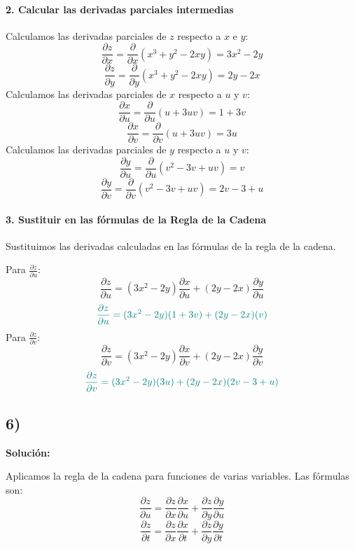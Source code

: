 \documentclass{article}
\begin{document}
\paragraph{2. Calcular las derivadas parciales intermedias}
Calculamos las derivadas parciales de $z$ respecto a $x$ e $y$:
\[
\frac{\partial z}{\partial x} = \frac{\partial}{\partial x}(x^3 + y^2 - 2xy) = 3x^2 - 2y
\]
\[
\frac{\partial z}{\partial y} = \frac{\partial}{\partial y}(x^3 + y^2 - 2xy) = 2y - 2x
\]
Calculamos las derivadas parciales de $x$ respecto a $u$ y $v$:
\[
\frac{\partial x}{\partial u} = \frac{\partial}{\partial u}(u + 3uv) = 1 + 3v
\]
\[
\frac{\partial x}{\partial v} = \frac{\partial}{\partial v}(u + 3uv) = 3u
\]
Calculamos las derivadas parciales de $y$ respecto a $u$ y $v$:
\[
\frac{\partial y}{\partial u} = \frac{\partial}{\partial u}(v^2 - 3v + uv) = v
\]
\[
\frac{\partial y}{\partial v} = \frac{\partial}{\partial v}(v^2 - 3v + uv) = 2v - 3 + u
\]

\paragraph{3. Sustituir en las fórmulas de la Regla de la Cadena}
Sustituimos las derivadas calculadas en las fórmulas de la regla de la cadena.

Para $\frac{\partial z}{\partial u}$:
\[
\frac{\partial z}{\partial u} = (3x^2 - 2y) \frac{\partial x}{\partial u} + (2y - 2x) \frac{\partial y}{\partial u}
\]
\[\color{teal}
\frac{\partial z}{\partial u} = (3x^2 - 2y) (1 + 3v) + (2y - 2x) (v)
\]
Para $\frac{\partial z}{\partial v}$:
\[
\frac{\partial z}{\partial v} = (3x^2 - 2y) \frac{\partial x}{\partial v} + (2y - 2x) \frac{\partial y}{\partial v}
\]
\[\color{teal}
\frac{\partial z}{\partial v} = (3x^2 - 2y) (3u) + (2y - 2x) (2v - 3 + u)
\]

\subsection*{6)}


\textbf{Solución:}

Aplicamos la regla de la cadena para funciones de varias variables. Las fórmulas son:
\[
\frac{\partial z}{\partial u} = \frac{\partial z}{\partial x} \frac{\partial x}{\partial u} + \frac{\partial z}{\partial y} \frac{\partial y}{\partial u}
\]
\[
\frac{\partial z}{\partial t} = \frac{\partial z}{\partial x} \frac{\partial x}{\partial t} + \frac{\partial z}{\partial y} \frac{\partial y}{\partial t}
\]

\vspace{1em}
\end{document}
